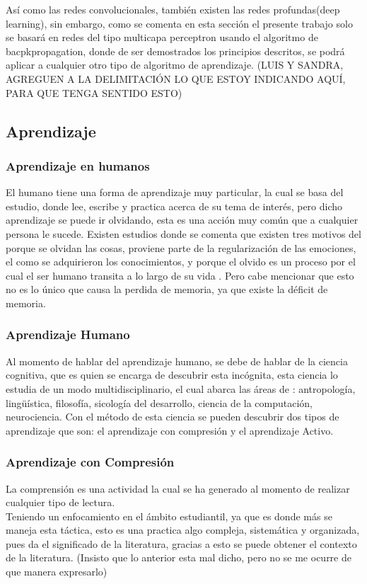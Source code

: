 Así como las redes convolucionales, también existen las redes profundas(deep learning), sin embargo, como se comenta en esta sección \label{sec:delimitation} el presente trabajo solo se basará en redes del tipo multicapa perceptron usando el algoritmo de bacpkpropagation, donde de ser demostrados los principios descritos, se podrá aplicar a cualquier otro tipo de algoritmo de aprendizaje.  (LUIS Y SANDRA, AGREGUEN A LA DELIMITACIÓN LO QUE ESTOY INDICANDO AQUÍ, PARA QUE TENGA SENTIDO ESTO)



\subsection{Aprendizaje}

\subsubsection{Aprendizaje en humanos}
        El humano tiene una forma de aprendizaje muy particular, la cual se basa del estudio, donde lee, escribe y practica acerca de
        su tema de interés, pero dicho aprendizaje se puede ir olvidando, esta es una acción muy común que a cualquier persona le sucede.
        Existen estudios donde se comenta que existen tres motivos del porque se olvidan las cosas, proviene parte de la regularización de las emociones,
        el como se adquirieron los conocimientos, y porque el olvido es un proceso por el cual el ser humano transita a lo largo de su vida \cite{Nrby2015}. Pero cabe
        mencionar que esto no es lo único que causa la perdida de memoria, ya que existe la déficit de memoria. 

    \subsubsection{Aprendizaje Humano}
        Al momento de hablar del aprendizaje humano, se debe de hablar de la ciencia cognitiva, que es quien se encarga de descubrir esta incógnita,
        esta ciencia lo estudia de un modo multidisciplinario, el cual abarca las \'areas de \cite{bransford2000}: antropología, lingüística, 
        filosofía, sicología del desarrollo, ciencia de la computación, neurociencia.
        Con el método de esta ciencia se pueden descubrir dos tipos de aprendizaje que son: el aprendizaje con compresi\'on y el aprendizaje Activo.
        
        \subsubsection{Aprendizaje con Compresi\'on}
            La comprensi\'on es una actividad la cual se ha generado al momento de realizar cualquier tipo de lectura.\\
            Teniendo un enfocamiento en el \'ambito estudiantil, ya que es donde m\'as se maneja esta t\'actica, esto es una
            practica algo compleja, sistemática y organizada, pues da el significado de la literatura, gracias a esto se puede
            obtener el contexto de la literatura.
            (Insisto que lo anterior esta mal dicho, pero no se me ocurre de que manera expresarlo)

